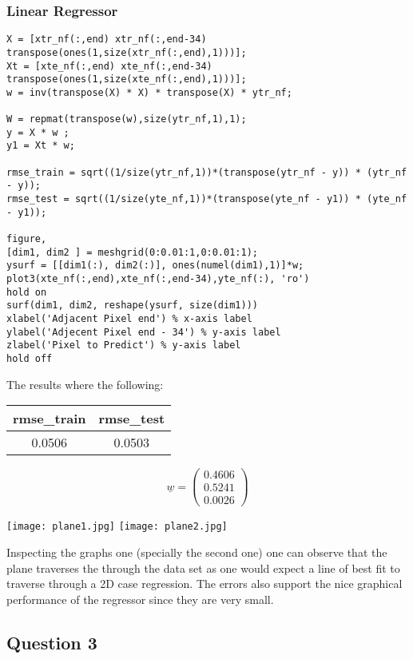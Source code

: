 \documentclass[11pt]{article}
\begin{document}
\subsubsection{Linear Regressor}
\begin{lstlisting}
X = [xtr_nf(:,end) xtr_nf(:,end-34) transpose(ones(1,size(xtr_nf(:,end),1)))];
Xt = [xte_nf(:,end) xte_nf(:,end-34) transpose(ones(1,size(xte_nf(:,end),1)))];
w = inv(transpose(X) * X) * transpose(X) * ytr_nf;

W = repmat(transpose(w),size(ytr_nf,1),1);
y = X * w ;
y1 = Xt * w;

rmse_train = sqrt((1/size(ytr_nf,1))*(transpose(ytr_nf - y)) * (ytr_nf - y));
rmse_test = sqrt((1/size(yte_nf,1))*(transpose(yte_nf - y1)) * (yte_nf - y1));

figure,
[dim1, dim2 ] = meshgrid(0:0.01:1,0:0.01:1);
ysurf = [[dim1(:), dim2(:)], ones(numel(dim1),1)]*w;
plot3(xte_nf(:,end),xte_nf(:,end-34),yte_nf(:), 'ro')
hold on
surf(dim1, dim2, reshape(ysurf, size(dim1)))
xlabel('Adjacent Pixel end') % x-axis label
ylabel('Adjecent Pixel end - 34') % y-axis label
zlabel('Pixel to Predict') % y-axis label
hold off

\end{lstlisting}
The results where the following:
\begin{center}
\begin{tabular}{|c|c|}
\hline
 rmse\_train & rmse\_test \\
 \hline
0.0506 & 0.0503 \\
\hline
\end{tabular}
\end{center}
\[
\underline{w} =
\left (
\begin{array}{c}
    0.4606 \\
   0.5241 \\
    0.0026\end{array} \right )
\]
 
\texttt{[image: plane1.jpg]}
\texttt{[image: plane2.jpg]}

Inspecting the graphs one (specially the second one) one can observe that the plane traverses the through the data set as one would expect a line of best fit to traverse through a 2D case regression. The errors also support the nice graphical performance of the regressor since they are very small.


\subsection{Question 3}
\end{document}

